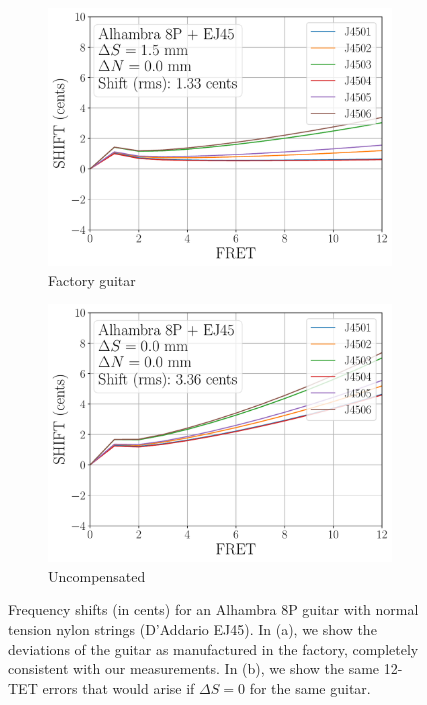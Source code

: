  \begin{figure}
  \centering
  \begin{subfigure}[b]{0.8\textwidth}
   \centering
   \includegraphics[width=5.0in]{../figures/shift_alhambra8p_ej45_factory}
   \caption{Factory guitar}
   \label{fig:shift_alhambra8p_ej45_factory}
  \end{subfigure}
  \par\vspace{0.25in}
  \begin{subfigure}[b]{0.8\textwidth}
   \centering
   \includegraphics[width=5.0in]{../figures/shift_alhambra8p_ej45_null}
   \caption{Uncompensated}
   \label{fig:shift_alhambra8p_ej45_null}
  \end{subfigure}
  \caption{\label{fig:alhambra8p_ej45} Frequency shifts (in cents) for an Alhambra 8P guitar with normal tension nylon strings (D'Addario EJ45). In (a), we show the deviations of the guitar as manufactured in the factory, completely consistent with our measurements. In (b), we show the same 12-TET errors that would arise if $\Delta S = 0$ for the same guitar.}
 \end{figure}

